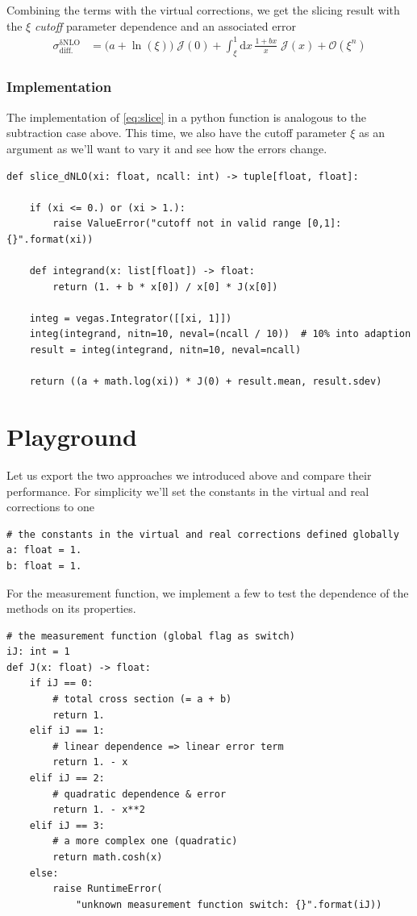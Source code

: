 \documentclass[11pt]{article}
\begin{document}
Combining the terms with the virtual corrections, we get the slicing result with the \(\xi\) \emph{cutoff} parameter
dependence and an associated error
\begin{align}
\label{eq:slice}
  \sigma^\mathrm{\delta NLO}_\mathrm{diff.}
  &=
  \bigl(a + \ln(\xi)\bigr) \;\mathcal{J}(0)
  +\int_\xi^1\mathrm{d}x\,\frac{1+bx}{x}
  \;\mathcal{J}(x)
  + \mathcal{O}(\xi^n)
\end{align}

\subsubsection{Implementation}
\label{sec:org217e96d}
The implementation of \eqref{eq:slice} in a python function is analogous to the subtraction case above.
This time, we also have the cutoff parameter \(\xi\) as an argument as we'll want to vary it and see how the errors change.
\begin{verbatim}
def slice_dNLO(xi: float, ncall: int) -> tuple[float, float]:

    if (xi <= 0.) or (xi > 1.):
        raise ValueError("cutoff not in valid range [0,1]: {}".format(xi))

    def integrand(x: list[float]) -> float:
        return (1. + b * x[0]) / x[0] * J(x[0])

    integ = vegas.Integrator([[xi, 1]])
    integ(integrand, nitn=10, neval=(ncall / 10))  # 10% into adaption
    result = integ(integrand, nitn=10, neval=ncall)

    return ((a + math.log(xi)) * J(0) + result.mean, result.sdev)
\end{verbatim}



\section{Playground}
\label{sec:org66b1b1b}
Let us export the two approaches we introduced above and compare their performance.
For simplicity we'll set the constants in the virtual and real corrections to one
\begin{verbatim}
# the constants in the virtual and real corrections defined globally
a: float = 1.
b: float = 1.
\end{verbatim}
For the measurement function, we implement a few to test the dependence of the methods on its properties.
\begin{verbatim}
# the measurement function (global flag as switch)
iJ: int = 1
def J(x: float) -> float:
    if iJ == 0:
        # total cross section (= a + b)
        return 1.
    elif iJ == 1:
        # linear dependence => linear error term
        return 1. - x
    elif iJ == 2:
        # quadratic dependence & error
        return 1. - x**2
    elif iJ == 3:
        # a more complex one (quadratic)
        return math.cosh(x)
    else:
        raise RuntimeError(
            "unknown measurement function switch: {}".format(iJ))
\end{verbatim}
\end{document}
